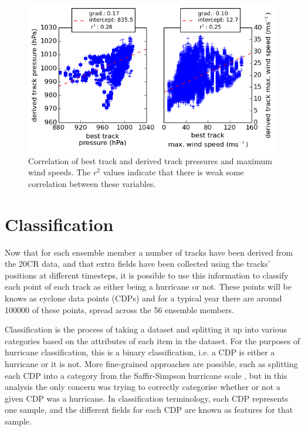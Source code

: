 \documentclass[pdftex,12pt,a4paper]{report}
\begin{document}
\begin{figure}[ht!]
    \centering
    \includegraphics[width=\textwidth]{figures/press_max_ws_corr_2005}
    \vspace{-10pt}
    \caption{Correlation of best track and derived track pressures and maximum wind speeds. The
        $r^2$ values indicate that there is weak some correlation between these variables. }
    \label{fig:press_max_ws_corr_2005}
\end{figure}

\newpage
\section{Classification}
\label{sec:classification}

Now that for each ensemble member a number of tracks have been derived from the 20CR data, and that
extra fields have been collected using the tracks' positions at different timesteps, it is possible
to use this information to classify each point of each track as either being a hurricane or not.
These points will be knows as cyclone data points (CDPs) and for a typical year there are around
\SI{100000}{} of these points, spread across the 56 ensemble members.

Classification is the process of taking a dataset and splitting it up into various categories based
on the attributes of each item in the dataset. For the purposes of hurricane classification, this is
a binary classification, i.e. a CDP is either a hurricane or it is not. More fine-grained approaches
are possible, such as splitting each CDP into a category from the Saffir-Simpson hurricane scale
\parencite{simpson1974hurricane}, but in this analysis the only concern was trying to correctly
categorise whether or not a given CDP was a hurricane. In classification terminology, each CDP
represents one sample, and the different fields for each CDP are known as features for that sample.
\end{document}
